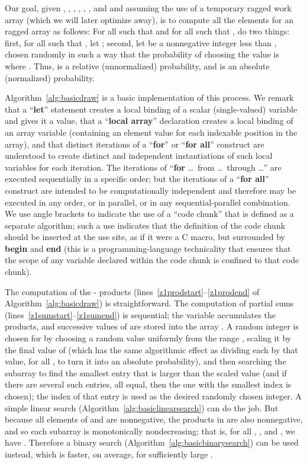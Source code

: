 \documentclass[10pt,nohyperref]{sigplanconf}
\begin{document}
Our goal, given , , , , , , and  and
assuming the use of a temporary  ragged work array  (which we will later optimize away), is to compute
all the elements for an  ragged array  as follows:
For all  such that  and for all  such that , do two things:
first, for all  such that , let ;
second, let  be a nonnegative integer less than , chosen randomly in such a way that the probability of choosing
the value  is  where
.
Thus,  is a relative (unnormalized) probability, and  is an absolute (normalized) probability.


Algorithm~\ref{alg:basicdraw} is a basic implementation of this process.
We remark that a ``{\bf let}'' statement creates a local binding of a scalar (single-valued) variable and gives it a value,
that a ``{\bf local array}'' declaration creates a local binding of an array variable
(containing an element value for each indexable position in the array), and that distinct iterations of a ``{\bf for}'' or ``{\bf for all}'' construct are understood to create
distinct and independent instantiations of such local variables for each iteration.  The iterations of ``{\bf for} \ldots\ from \ldots\ through \ldots''
are executed sequentially in a specific order; but the iterations of a ``{\bf for all}'' construct are intended to be computationally independent
and therefore may be executed in any order, or in parallel, or in any sequential-parallel combination.
We use angle brackets to indicate the use of a ``code chunk'' that is defined as a separate algorithm;
such a use indicates that the definition of the code chunk should be inserted at the use site, as if it were a C macro,
but surrounded by {\bf begin} and {\bf end} (this is a programming-language
technicality that ensures that the scope of any variable declared within the code chunk is confined to that code chunk).


The computation of the - products (lines~\hbox{\ref{z1prodstart}--\ref{z1prodend}} of Algorithm~\ref{alg:basicdraw}) is straightforward.
The computation of partial sums (lines~\hbox{\ref{z1sumstart}--\ref{z1sumend}}) is sequential; the variable 
accumulates the products, and successive values of  are stored into the array .
A random integer is chosen for  by choosing a random value uniformly from the range ,
scaling it by the final value of  (which has the same algorithmic effect as dividing each 
by that value, for all , to turn it into an absolute probability), and then searching the subarray 
to find the smallest entry that is larger than the scaled value (and if there are several such entries, all equal,
then the one with the smallest index is chosen); the index  of that entry is used as the desired
randomly chosen integer.   A simple linear search (Algorithm~\ref{alg:basiclinearsearch}) can do the job.
But because all elements of  and  are nonnegative,
the products in  are also nonnegative, and so each subarray  is monotonically nondecreasing;
that is, for all , , and , we have .
Therefore a binary search (Algorithm~\ref{alg:basicbinarysearch}) can be used instead, which is faster,
on average, for  sufficiently large
\cite[exercise 6.2.1-5]{KNUTH-VOLUME-3}.
\end{document}
